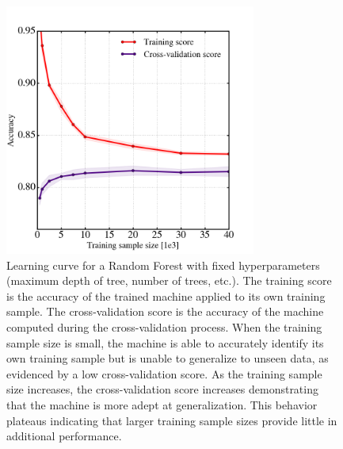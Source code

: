 \documentclass[twocolumn]{aastex6}
\begin{document}
\begin{figure}[t!]
\includegraphics[width=3.25in]{figures/learning_curve_RF.png}
\caption{Learning curve for a Random Forest with fixed hyperparameters (maximum depth of tree, number of trees, etc.). The training score is the accuracy of the trained machine applied to its own training sample. The cross-validation score is the accuracy of the machine computed during the cross-validation process. When the training sample size is small, the machine is able to accurately identify its own training sample but is unable to generalize to unseen data, as evidenced by a low cross-validation score. As the training sample size increases, the cross-validation score increases demonstrating that the machine is more adept at generalization. This behavior plateaus indicating that larger training sample sizes provide little in additional performance. \label{fig: learning curve}}
\end{figure}
\end{document}
